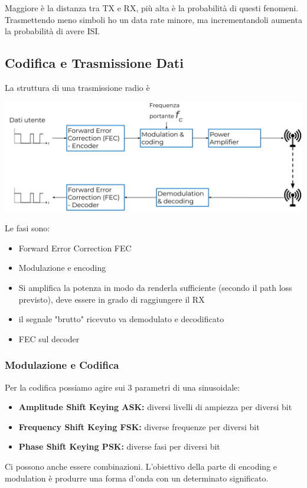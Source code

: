 Maggiore è la distanza tra TX e RX, più alta è la probabilità di questi fenomeni. Trasmettendo meno simboli ho un data rate minore, ma incrementandoli aumenta la probabilità di avere ISI. \\

\newpage

\subsection{Codifica e Trasmissione Dati}
La struttura di una trasmissione radio è
\begin{center}
	\includegraphics[width=0.95\linewidth]{img/wireless/struttrasmissione}
\end{center}

Le fasi sono: 
\begin{itemize}
	\item Forward Error Correction FEC
	\item Modulazione e encoding
	\item Si amplifica la potenza in modo da renderla sufficiente (secondo il path loss previsto), deve essere in grado di raggiungere il RX
	\item il segnale "brutto" ricevuto va demodulato e decodificato
	\item FEC sul decoder
\end{itemize}

\subsubsection{Modulazione e Codifica}
Per la codifica possiamo agire sui 3 parametri di una sinusoidale:
\begin{itemize}
	\item \textbf{Amplitude Shift Keying ASK:} diversi livelli di ampiezza per diversi bit
	\item \textbf{Frequency Shift Keying FSK:} diverse frequenze per diversi bit
	\item \textbf{Phase Shift Keying PSK:} diverse fasi per diversi bit
\end{itemize}
Ci possono anche essere combinazioni. L'obiettivo della parte di encoding e modulation è produrre una forma d'onda con un determinato significato.\\

